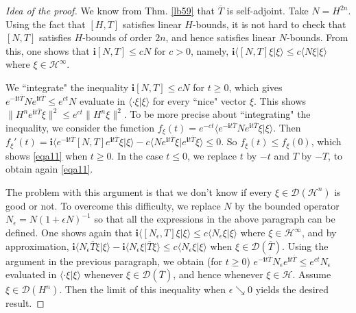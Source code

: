 \documentclass[12pt,b5paper,notitlepage]{article}
\theoremstyle{definition}
\theoremstyle{plain}
\newcommand{\mc}{\mathcal}
\newcommand{\ovl}{\overline}
\newcommand{\Dom}{\scr{D}}
\newcommand{\bk}[1]{\langle {#1}\rangle}
\newcommand{\scr}{\mathscr}
\newcommand{\im}{\mathbf{i}}
\numberwithin{equation}{section}
\begin{document}
\begin{proof}[Idea of the proof]
We know from Thm. \ref{lb59} that $\ovl T$ is self-adjoint. Take $N=H^{2n}$. Using the fact that $[H,T]$ satisfies linear $H$-bounds, it is not hard to check that $[N,T]$ satisfies $H$-bounds of order $2n$, and hence satisfies linear $N$-bounds. From this, one shows that $\im[N,T]\leq cN$ for $c>0$, namely, $\im\bk{[N,T]\xi|\xi}\leq c\bk{N\xi|\xi}$ where $\xi\in\mc H^\infty$.

We ``integrate" the inequality $\im[N,T]\leq cN$ for $t\geq 0$, which gives $e^{-\im t\ovl T}Ne^{\im t\ovl T}\leq e^{ct}N$ evaluate in $\bk{\cdot \xi|\xi}$ for every ``nice" vector $\xi$. This shows $\lVert H^ne^{\im t\ovl T}\xi\lVert^2\leq e^{ct}\lVert H^n\xi\lVert^2$. To be more precise about ``integrating" the inequality, we consider the function $f_\xi(t)=e^{-ct}\bk{e^{-\im t\ovl T}Ne^{\im t\ovl T}\xi|\xi}$. Then $f_\xi'(t)=\im\bk{e^{-\im t\ovl T}[N,T]e^{\im t\ovl T}\xi|\xi}- c\bk{Ne^{\im t\ovl T}\xi|e^{\im t\ovl T}\xi}\leq 0$. So $f_\xi(t)\leq f_\xi(0)$, which shows \eqref{eqa11} when $t\geq 0$. In the case $t\leq 0$, we replace $t$ by $-t$ and $T$ by $-T$, to obtain again \eqref{eqa11}.

The problem with this argument is that we don't know if every $\xi\in\Dom(\mc H^n)$ is good or not. To overcome this difficulty, we replace $N$ by the bounded operator $N_\epsilon=N(1+\epsilon N)^{-1}$ so that all the expressions in the above paragraph can be defined. One shows again that $\im\bk{[N_\epsilon,T]\xi|\xi}\leq c\bk{N_\epsilon\xi|\xi}$ where $\xi\in\mc H^\infty$, and by approximation, $\im\bk{N_\epsilon \ovl T\xi|\xi}-\im\bk{N_\epsilon\xi|\ovl T\xi}\leq c\bk{N_\epsilon\xi|\xi}$ when $\xi\in\Dom(\ovl T)$. Using the argument in the previous paragraph, we obtain (for $t\geq 0$) $e^{-\im t\ovl T}N_\epsilon e^{\im t\ovl T}\leq e^{ct}N_\epsilon$  evaluated in $\bk{\cdot \xi|\xi}$ whenever $\xi\in\Dom(\ovl T)$, and hence whenever $\xi\in\mc H$. Assume $\xi\in\Dom(H^n)$.  Then the limit of this inequality when $\epsilon\searrow0$ yields the desired result.
\end{proof}


\end{document}
